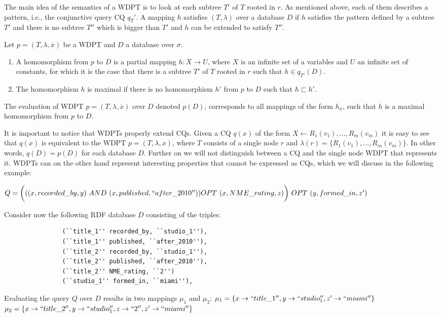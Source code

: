 			The main idea of the semantics of a WDPT is to look at each subtree $T'$ of
			$T$ rooted in $r$. As mentioned above, each of them describes a pattern, i.e.,
			the conjunctive query CQ $q_T'$. A mapping $h$ satisfies $(T,\lambda)$ over
			a database $D$ if $h$ satisfies the pattern defined by a subtree $T'$ and there
			is no subtree $T''$ which is bigger than $T'$ and $h$ can be extended to satisfy
			$T''$.
			\begin{definition}
				Let $p=(T,\lambda,\overline{x})$ be a WDPT and $D$ a database over $\sigma$.

				\begin{enumerate}
					\item A homomorphism from $p$ to $D$ is a partial mapping $h: X \rightarrow U$,
						where $X$ is an infinite set of a variables and $U$ an infinite set of
						constants, for which it is the case that there is a subtree $T'$ of $T$ rooted
						in $r$ such that $h \in q_{T'}(D)$.
					\item The homomorphism $h$ is maximal if there is no homomorphism $h'$ from $p$
						to $D$ such that $h \sqsubset h'$.
				\end{enumerate}
				The evaluation of WDPT $p = (T,\lambda,\overline{x})$ over $D$ denoted $p(D)$,
				corresponds to all mappings of the form $h_{\overline{x}}$, such that $h$ is a
				maximal homomorphism from $p$ to $D$.
			\end{definition}

			It is important to notice that WDPTs properly extend CQs.
			Given a CQ $q(x)$ of the form $X \leftarrow R_1(v_1),\dots,R_m(v_m)$
			it is easy to see that $q(x)$ is equivalent to the WDPT $p = (T,\lambda,x)$,
			where $T$ consists of a single node $r$ and $\lambda(r) =
			\{R_1(v_1),\dots,R_m(v_m)\}$. In other words, $q(D) = p(D)$ for each database
			$D$. Further on we will not distinguish between a CQ and the single node WDPT
			that represents it. WDPTs can on the other hand represent interesting properties
			that cannot be expressed as CQs, which we will discuss in the following example:
			\begin{example}
				$Q =  \bigg(((x,recorded\_by,y) \ AND \ (x,published, ``after\_2010'')) \ \\ OPT \ (x,
				NME\_rating,z)\bigg) \ OPT \ (y, formed\_in, z') $

				\noindent Consider now the following RDF database $D$ consisting of the triples:

				\begin{verbatim}
				(``title_1'' recorded_by, ``studio_1''),
				(``title_1'' published, ``after_2010''),
				(``title_2'' recorded_by, ``studio_1''),
				(``title_2'' published, ``after_2010''),
				(``title_2'' NME_rating, ``2'')
				(``studio_1'' formed_in, ``miami''),
				\end{verbatim}
				Evaluating the query $Q$ over $D$ results in two mappings $\mu_1$ and $\mu_2$:
				$\mu_1 = \{ x \rightarrow ``title\_1'', y \rightarrow ``studio_1'',z'
				\rightarrow ``miami'' \}$ 
				$\mu_2 = \{ x \rightarrow ``title\_2'', y \rightarrow ``studio_1'',z\rightarrow
				``2'', z' \rightarrow ``miami'' \}$ 
			\end{example}

